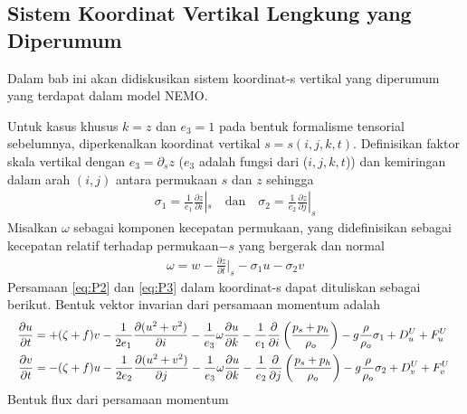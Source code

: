 \begin{spacing}{1.5}
\subsection[Sistem Koordinat-s Vertikal Lengkung yang Diperumum]{Sistem Koordinat Vertikal Lengkung yang Diperumum}	
	Dalam bab ini akan didiskusikan sistem koordinat-s vertikal yang diperumum yang terdapat dalam model NEMO.
	
	Untuk kasus khusus $k=z$ dan $e_3=1$ pada bentuk formalisme tensorial sebelumnya, diperkenalkan koordinat vertikal $s=s(i,j,k,t)$. Definisikan faktor skala vertikal dengan $e_3=\partial_sz$ ($e_3$ adalah fungsi dari ($i,j,k,t$)) dan kemiringan dalam arah $(i,j)$ antara permukaan $s$ dan $z$ sehingga
	\begin{equation}
		\begin{aligned}
			\sigma_1=\frac{1}{e_1}\frac{\partial z}{\partial i}|_s \quad \text{dan}\quad \sigma_2=\frac{1}{e_2}\frac{\partial z}{\partial j}|_s
		\end{aligned}
	\end{equation}
	Misalkan $\omega$ sebagai komponen kecepatan permukaan, yang didefinisikan sebagai kecepatan relatif terhadap permukaan$-s$ yang bergerak dan normal
	\begin{equation*}
		\begin{aligned}
			\omega = w-\frac{\partial z}{\partial t}|_s - \sigma_1 u-\sigma_2v
		\end{aligned}
	\end{equation*}
	Persamaan \ref{eq:P2} dan \ref{eq:P3} dalam koordinat-s dapat dituliskan sebagai berikut.
	Bentuk vektor invarian dari persamaan momentum adalah
	\begin{equation}
		\resizebox{\textwidth}{!}{%
			$
			\begin{aligned}
				\frac{\partial u}{\partial t} &= +(\zeta +f)v -  \frac{1}{2e_1}\frac{\partial (u^2+v^2)}{\partial i}-\frac{1}{e_3}\omega\frac{\partial u}{\partial k} - \frac{1}{e_1}\frac{\partial}{\partial i}\left(\frac{p_s+p_h}{\rho_o}\right)-g\frac{\rho}{\rho_o}\sigma_1+D^U_u+F^U_u  \\
				\frac{\partial v}{\partial t} &= -(\zeta +f)u -  \frac{1}{2e_2}\frac{\partial (u^2+v^2)}{\partial j}-\frac{1}{e_3}\omega\frac{\partial u}{\partial k} - \frac{1}{e_2}\frac{\partial}{\partial j}\left(\frac{p_s+p_h}{\rho_o}\right)-g\frac{\rho}{\rho_o}\sigma_2+D^U_v+F^U_v%
			\end{aligned}
			$
		}
	\end{equation}
	Bentuk flux dari persamaan momentum
	\begin{equation*}

\end{equation*}
\end{spacing}
